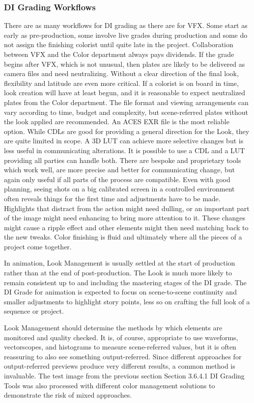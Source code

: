 \subsubsection{DI Grading Workflows}

There are as many workflows for DI grading as there are for VFX. Some start as early as pre-production, some involve live grades during production and some do not assign the finishing colorist until quite late in the project. Collaboration between VFX and the Color department always pays dividends. If the grade begins after VFX, which is not unusual, then plates are likely to be delivered as camera files and need neutralizing. Without a clear direction of the final look, flexibility and latitude are even more critical. If a colorist is on board in time, look creation will have at least begun, and it is reasonable to expect neutralized plates from the Color department. The file format and viewing arrangements can vary according to time, budget and complexity, but scene-referred plates without the look applied are recommended. An ACES EXR file is the most reliable option.  While CDLs are good for providing a general direction for the Look, they are quite limited in scope. A 3D LUT can achieve more selective changes but is less useful in communicating alterations. It is possible to use a CDL and a LUT providing all parties can handle both. There are bespoke and proprietary tools which work well, are more precise and better for communicating change, but again only useful if all parts of the process are compatible. Even with good planning, seeing shots on a big calibrated screen in a controlled environment often reveals things for the first time and adjustments have to be made.  Highlights that distract from the action might need dulling, or an important part of the image might need enhancing to bring more attention to it. These changes might cause a ripple effect and other elements might then need matching back to the new tweaks. Color finishing is fluid and ultimately where all the pieces of a project come together.

In animation, Look Management is usually settled at the start of production rather than at the end of post-production. The Look is much more likely to remain consistent up to and including the mastering stages of the DI grade. The DI Grade for animation is expected to focus on scene-to-scene continuity and smaller adjustments to highlight story points, less so on crafting the full look of a sequence or project.

Look Management should determine the methods by which elements are monitored and quality checked. It is, of course, appropriate to use waveforms, vectorscopes, and histograms to measure scene-referred values, but it is often reassuring to also see something output-referred. Since different approaches for output-referred previews produce very different results, a common method is invaluable. The test image from the previous section Section 3.6.4.1 DI Grading Tools was also processed with different color management solutions to demonstrate the risk of mixed approaches.


